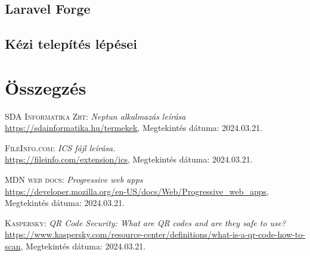 \documentclass[
]{thesis-ekf}
\theoremstyle{definition}
\theoremstyle{remark}
\begin{document}
\section{Laravel Forge}
\section{Kézi telepítés lépései}

\chapter*{Összegzés}

\begin{thebibliography}{2}

\textsc{SDA Informatika Zrt:} \emph{Neptun alkalmazás leírása}
\\
\url{https://sdainformatika.hu/termekek}, Megtekintés dátuma: 2024.03.21.

\textsc{FileInfo.com}: \emph{ICS fájl leírása.}
\\
\url{https://fileinfo.com/extension/ics}, Megtekintés dátuma: 2024.03.21.

\textsc{MDN web docs}: \emph{Progressive web apps}
\\
\url{https://developer.mozilla.org/en-US/docs/Web/Progressive_web_apps}, Megtekintés dátuma: 2024.03.21.

\textsc{Kaspersky}: \emph{QR Code Security: What are QR codes and are they safe to use?}
\\
\url{https://www.kaspersky.com/resource-center/definitions/what-is-a-qr-code-how-to-scan}, Megtekintés dátuma: 2024.03.21.

\end{thebibliography}

%
\end{document}
